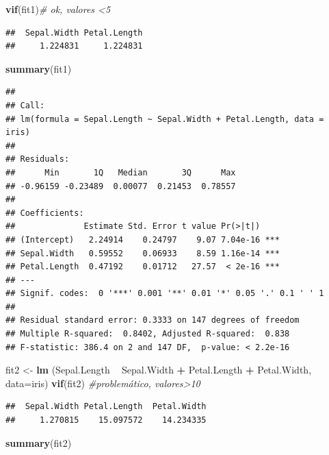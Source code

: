 \documentclass[
]{book}
\newenvironment{Shaded}{\begin{snugshade}}{\end{snugshade}}
\newcommand{\CommentTok}[1]{\textcolor[rgb]{0.56,0.35,0.01}{\textit{#1}}}
\newcommand{\DataTypeTok}[1]{\textcolor[rgb]{0.13,0.29,0.53}{#1}}
\newcommand{\KeywordTok}[1]{\textcolor[rgb]{0.13,0.29,0.53}{\textbf{#1}}}
\newcommand{\NormalTok}[1]{#1}
\newcommand{\OperatorTok}[1]{\textcolor[rgb]{0.81,0.36,0.00}{\textbf{#1}}}
\newcommand{\StringTok}[1]{\textcolor[rgb]{0.31,0.60,0.02}{#1}}
\begin{document}
\begin{Shaded}
\begin{Highlighting}[]
\KeywordTok{vif}\NormalTok{(fit1)}\CommentTok{# ok, valores <5}
\end{Highlighting}
\end{Shaded}

\begin{verbatim}
##  Sepal.Width Petal.Length 
##     1.224831     1.224831
\end{verbatim}

\begin{Shaded}
\begin{Highlighting}[]
\KeywordTok{summary}\NormalTok{(fit1)}
\end{Highlighting}
\end{Shaded}

\begin{verbatim}
## 
## Call:
## lm(formula = Sepal.Length ~ Sepal.Width + Petal.Length, data = iris)
## 
## Residuals:
##      Min       1Q   Median       3Q      Max 
## -0.96159 -0.23489  0.00077  0.21453  0.78557 
## 
## Coefficients:
##              Estimate Std. Error t value Pr(>|t|)    
## (Intercept)   2.24914    0.24797    9.07 7.04e-16 ***
## Sepal.Width   0.59552    0.06933    8.59 1.16e-14 ***
## Petal.Length  0.47192    0.01712   27.57  < 2e-16 ***
## ---
## Signif. codes:  0 '***' 0.001 '**' 0.01 '*' 0.05 '.' 0.1 ' ' 1
## 
## Residual standard error: 0.3333 on 147 degrees of freedom
## Multiple R-squared:  0.8402, Adjusted R-squared:  0.838 
## F-statistic: 386.4 on 2 and 147 DF,  p-value: < 2.2e-16
\end{verbatim}

\begin{Shaded}
\begin{Highlighting}[]
\NormalTok{fit2 <-}\StringTok{ }\KeywordTok{lm}\NormalTok{ (Sepal.Length }\OperatorTok{~}\StringTok{ }\NormalTok{Sepal.Width }\OperatorTok{+}\StringTok{ }\NormalTok{Petal.Length }\OperatorTok{+}\StringTok{ }\NormalTok{Petal.Width, }\DataTypeTok{data=}\NormalTok{iris)}
\KeywordTok{vif}\NormalTok{(fit2) }\CommentTok{#problemático, valores>10}
\end{Highlighting}
\end{Shaded}

\begin{verbatim}
##  Sepal.Width Petal.Length  Petal.Width 
##     1.270815    15.097572    14.234335
\end{verbatim}

\begin{Shaded}
\begin{Highlighting}[]
\KeywordTok{summary}\NormalTok{(fit2)}
\end{Highlighting}
\end{Shaded}
\end{document}
